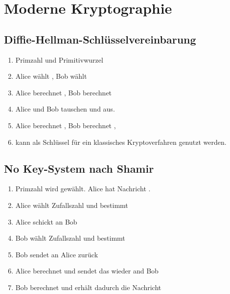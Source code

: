 \chapter{Moderne Kryptographie}
\section{Diffie-Hellman-Schlüsselvereinbarung}
\begin{enumerate}
    \item
        Primzahl  und Primitivwurzel 
    \item
        Alice wählt , Bob wählt 
    \item
        Alice berechnet ,
        Bob berechnet 
    \item Alice und Bob tauschen  und  aus.
    \item
        Alice berechnet ,
        Bob berechnet ,
    \item
         kann als Schlüssel für ein klassisches Kryptoverfahren
        genutzt werden.
\end{enumerate}

\section{No Key-System nach Shamir}
\begin{enumerate}
    \item
        Primzahl  wird gewählt. Alice hat Nachricht .
    \item
        Alice wählt Zufallszahl  
            und bestimmt 
    \item
        Alice schickt  an Bob
    \item
        Bob wählt Zufallszahl 
            und bestimmt 
    \item
        Bob sendet  an Alice zurück
    \item
        Alice berechnet  und sendet
        das wieder and Bob
    \item
        Bob berechnet  und erhält
        dadurch die Nachricht
\end{enumerate}

